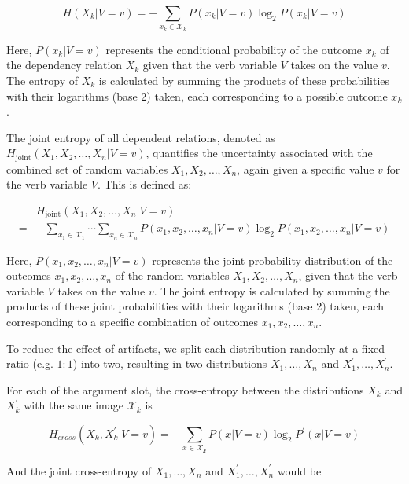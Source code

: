 \begin{equation*}
  H(X_{k}|V=v)=
  -\sum\limits_{x_{k}\in{}\mathcal{X}_{k}}{P(x_{k}|V=v)\log_{2}{P(x_{k}|V=v)}}  
\end{equation*}

Here, $P(x_k | V = v)$ represents the conditional probability of the outcome $x_k$ of the dependency relation $X_k$ given that the verb variable $V$ takes on the value $v$. The entropy of $X_k$ is calculated by summing the products of these probabilities with their logarithms (base 2) taken, each corresponding to a possible outcome $x_k$.

The joint entropy of all dependent relations, denoted as $H_{\text{joint}}(X_1, X_2, \ldots, X_n | V = v)$, quantifies the uncertainty associated with the combined set of random variables $X_1, X_2, \ldots, X_n$, again given a specific value $v$ for the verb variable $V$. This is defined as:

\begin{equation*}
\begin{split}
 & H_{\text{joint}}(X_1, X_2, \ldots, X_n | V=v) \\
=& -\sum\limits_{x_1\in{}\mathcal{X}_1}\cdots\sum\limits_{x_n\in{}\mathcal{X}_n}{P(x_1, x_2, \ldots,x_{n}|V=v)\log_2P(x_1, x_2, \ldots,x_n|V=v)}
\end{split}
\end{equation*}

Here, $P(x_1, x_2, \ldots, x_n | V = v)$ represents the joint probability distribution of the outcomes $x_1, x_2, \ldots, x_n$ of the random variables $X_1, X_2, \ldots, X_n$, given that the verb variable $V$ takes on the value $v$. The joint entropy is calculated by summing the products of these joint probabilities with their logarithms (base 2) taken, each corresponding to a specific combination of outcomes $x_1, x_2, \ldots, x_n$.

To reduce the effect of artifacts, we split each distribution randomly at a fixed ratio (e.g. $1:1$) into two, resulting in two distributions $X_1,\ldots,X_n$ and $X^{\prime}_{1},\ldots,X^{\prime}_{n}$. 

For each of the argument slot, the cross-entropy between the distributions $X_k$ and $X_k^{\prime}$ with the same image $\mathcal{X}_{k}$ is

$$
H_{cross}{(X_k,X_k^{\prime}|V=v)}=
-\sum\limits_{x\in{}\mathcal{X_{k}}}{P(x|V=v)\log_{2}{P^{\prime}(x|V=v)}}
$$

And the joint cross-entropy of  $X_1,\ldots,X_n$ and $X_1^{\prime},\ldots,X_n^{\prime}$ would be

